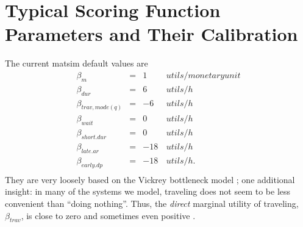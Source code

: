 \section{Typical Scoring Function Parameters and Their Calibration}
\label{sec:typicalParams}



The current \gls{matsim} default values are
\begin{equation}
  \begin{array}{lcrl}
\beta_{m} & = & 1\, & utils/monetary unit \\
\beta_{dur} & = & 6\, & utils/h \\
\beta_{trav, mode(q)} & = & -6 & utils/h \\ %
\beta_{wait} & = & 0\, & utils/h \\
\beta_{short.dur} & = & 0\, & utils/h \\
\beta_{late.ar} & = & -18\, & utils/h \\
\beta_{early.dp} & = & -18\, & utils/h .\\
  \end{array}
\label{eq:std-params}
\end{equation}
They are very loosely based on the Vickrey bottleneck model \citep[e.g.][]{ArnottEtcBottleneck-inelastic}; one additional insight: in many of the systems we model, traveling does not seem to be less convenient than ``doing nothing''.  Thus, the \emph{direct} marginal utility of traveling, $\beta_{trav}$, is close to zero and sometimes even positive \citep[see, e.g.,][]{RedmondMokhtarian_Transportation_2001,PawlakEtAl_ICMC_2011} .



